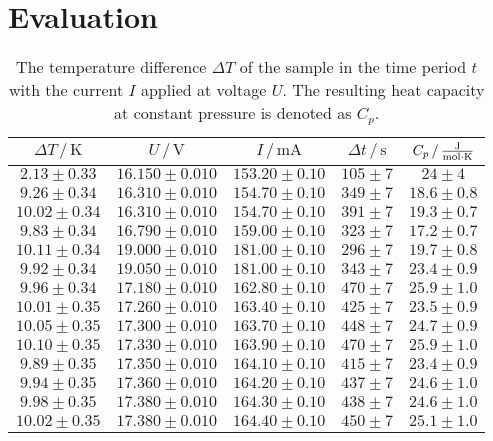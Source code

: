 \section{Evaluation}
\label{sec:Auswertung}

\begin{table}
    \centering
    \caption{The temperature difference $\Delta T$ of the sample in the time period $t$ with the current $I$ applied at voltage $U$. The resulting heat capacity at constant pressure is denoted as $C_p$.}
    \label{tab:C_p}
    \begin{tabular}{c c c c c}
        \toprule
        $\Delta T \,/\, \unit{\kelvin}$ & $U \,/\, \unit{\volt}$ & $I \,/\, \unit{\milli\ampere}$ & $\Delta t \,/\, \unit{\second}$ & $C_p \,/\, \unit{\frac{\joule}{\mol \cdot \kelvin}}$ \\
        \midrule
        $2.13\pm0.33$ & $16.150\pm0.010$ & $153.20\pm0.10$ & $105\pm7$ & $24\pm4$ \\
        $9.26\pm0.34$ & $16.310\pm0.010$ & $154.70\pm0.10$ & $349\pm7$ & $18.6\pm0.8$ \\
        $10.02\pm0.34$ & $16.310\pm0.010$ & $154.70\pm0.10$ & $391\pm7$ & $19.3\pm0.7$ \\
        $9.83\pm0.34$ & $16.790\pm0.010$ & $159.00\pm0.10$ & $323\pm7$ & $17.2\pm0.7$ \\
        $10.11\pm0.34$ & $19.000\pm0.010$ & $181.00\pm0.10$ & $296\pm7$ & $19.7\pm0.8$ \\
        $9.92\pm0.34$ & $19.050\pm0.010$ & $181.00\pm0.10$ & $343\pm7$ & $23.4\pm0.9$ \\
        $9.96\pm0.34$ & $17.180\pm0.010$ & $162.80\pm0.10$ & $470\pm7$ & $25.9\pm1.0$ \\
        $10.01\pm0.35$ & $17.260\pm0.010$ & $163.40\pm0.10$ & $425\pm7$ & $23.5\pm0.9$ \\
        $10.05\pm0.35$ & $17.300\pm0.010$ & $163.70\pm0.10$ & $448\pm7$ & $24.7\pm0.9$ \\
        $10.10\pm0.35$ & $17.330\pm0.010$ & $163.90\pm0.10$ & $470\pm7$ & $25.9\pm1.0$ \\
        $9.89\pm0.35$ & $17.350\pm0.010$ & $164.10\pm0.10$ & $415\pm7$ & $23.4\pm0.9$ \\
        $9.94\pm0.35$ & $17.360\pm0.010$ & $164.20\pm0.10$ & $437\pm7$ & $24.6\pm1.0$ \\
        $9.98\pm0.35$ & $17.380\pm0.010$ & $164.30\pm0.10$ & $438\pm7$ & $24.6\pm1.0$ \\
        $10.02\pm0.35$ & $17.380\pm0.010$ & $164.40\pm0.10$ & $450\pm7$ & $25.1\pm1.0$ \\

\end{tabular}
\end{table}
